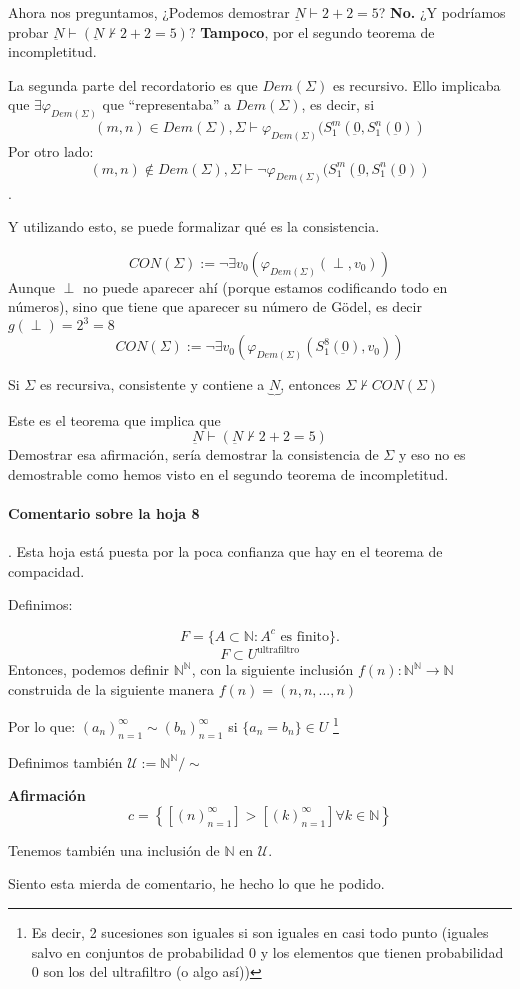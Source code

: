 Ahora nos preguntamos, ¿Podemos demostrar $\underbar{N} \vdash 2+2 = 5$? \textbf{No.} 
%
¿Y podríamos probar $\underbar{N} \vdash \left( \underbar{N} \not \vdash 2+2=5 \right)$? 
\textbf{Tampoco}, por el segundo teorema de incompletitud.

La segunda parte del recordatorio es que $Dem(Σ)$ es recursivo. Ello implicaba que $\exists φ_{Dem(Σ)}$ que ``representaba'' a $Dem(Σ)$, es decir, si $$(m,n) \in Dem(Σ), Σ\vdash φ_{Dem(Σ)}(S_1^m(\underbar{0},S_1^n(\underbar{0}))$$ 
Por otro lado: $$(m,n) \not \in Dem(Σ), Σ\vdash \neg φ_{Dem(Σ)}(S_1^m(\underbar{0},S_1^n(\underbar{0}))$$.

Y utilizando esto, se puede formalizar qué es la consistencia.

\begin{defn}
\[CON(Σ) := \neg ∃ v_0 \left( φ_{Dem(Σ)}(\perp,v_0) \right)\]
Aunque $\perp$ no puede aparecer ahí (porque estamos codificando todo en números), sino que tiene que aparecer su número de Gödel, es decir $g(\perp) = 2^3 = 8$
\[CON(Σ) := \neg ∃ v_0 \left( φ_{Dem(Σ)}(S_1^8(\underbar{0}),v_0) \right)\]
\end{defn}

\begin{theorem}
Si $Σ$ es recursiva, consistente y contiene a $\underbrace{N}$, entonces $Σ\not\vdash CON(Σ)$
\end{theorem}

Este es el teorema que implica que \[\underbar{N} \vdash \left( \underbar{N} \not \vdash 2+2=5 \right)\]
Demostrar esa afirmación, sería demostrar la consistencia de $Σ$ y eso no es demostrable como hemos visto en el segundo teorema de incompletitud.


\paragraph{Comentario sobre la hoja 8}. Esta hoja está puesta por la poca confianza que hay en el teorema de compacidad.

Definimos:

\[F = \{A\subset ℕ : A^c \text{ es finito}\}.\]
\[F\subset U^{\text{ultrafiltro}}\]
Entonces, podemos definir $ℕ^ℕ$, con la siguiente inclusión $f(n) : ℕ^ℕ \to ℕ$ construida de la siguiente manera $f(n) = (n,n, ... ,n)$

Por lo que: $(a_n)_{n=1}^{∞} \sim (b_n)_{n=1}^{∞}$ si $\{a_n = b_n\} \in U$ \footnote{Es decir, 2 sucesiones son iguales si son iguales en casi todo punto (iguales salvo en conjuntos de probabilidad 0 y los elementos que tienen probabilidad 0 son los del ultrafiltro (o algo así))}

Definimos también $\mathcal{U} := ℕ^ℕ / \sim$

\textbf{Afirmación} \[c = \left\{\left[ (n)_{n=1}^{∞} \right] > \left[ (k)_{n=1}^{∞} \right] ∀k∈ℕ\right\}\]

Tenemos también una inclusión de $ℕ$ en $\mathcal{U}$.

Siento esta mierda de comentario, he hecho lo que he podido.
